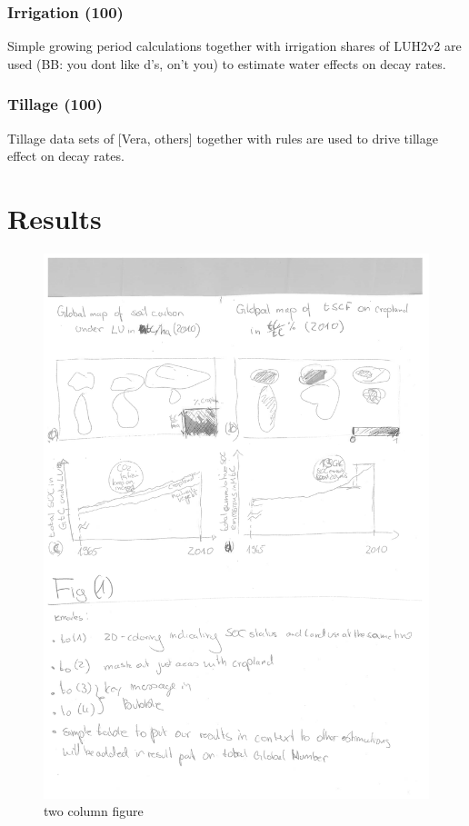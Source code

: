 \documentclass[gc, manuscript]{copernicus}
\begin{document}
\subsubsection{Irrigation (100)}

Simple growing period calculations together with irrigation shares of
LUH2v2 are used (BB: you dont like d's, on't you) to estimate water
effects on decay rates.

\subsubsection{Tillage (100)}

Tillage data sets of {[}Vera, others{]} together with rules are used to
drive tillage effect on decay rates. \newpage

\section{Results}

\begin{figure}
\includegraphics[width=12cm]{images/figs_draft-1} \caption{two column figure}\label{fig:unnamed-chunk-6}
\end{figure}
\end{document}
